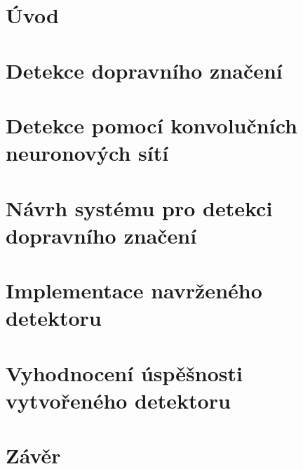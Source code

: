 \chapter{Úvod}



\chapter{Detekce dopravního značení}
\label{detekceZnacek}



\chapter{Detekce pomocí konvolučních neuronových sítí}
\label{detekceKonv}



\chapter{Návrh systému pro detekci dopravního značení}
\label{navrhDetektoru}



\chapter{Implementace navrženého detektoru}
\label{implementaceDetektoru}



\chapter{Vyhodnocení úspěšnosti vytvořeného detektoru}
\label{vyhodnoceniDetektoru}



\chapter{Závěr}
